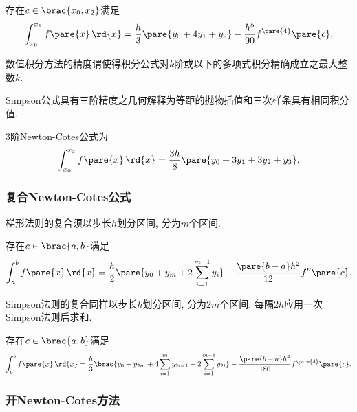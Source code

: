 \documentclass{ctexart}
\begin{document}
\begin{theorem}[Simpson法则]
    存在$c\in\brac{x_0,x_2}$满足
    \[ \int_{x_0}^{x_1} f\pare{x}\,\rd{x} = \frac{h}{3}\pare{y_0 + 4y_1 + y_2} - \frac{h^5}{90}f^{\pare{4}}\pare{c}. \]
\end{theorem}
\begin{definition}[精度]
    数值积分方法的精度谓使得积分公式对$k$阶或以下的多项式积分精确成立之最大整数$k$.
\end{definition}
\begin{remark}
    Simpson公式具有三阶精度之几何解释为等距的抛物插值和三次样条具有相同积分值.
\end{remark}
\begin{ex}[Simpson 3/8公式]
    3阶Newton-Cotes公式为
    \[ \int_{x_0}^{x_3}f\pare{x}\,\rd{x} = \frac{3h}{8}\pare{y_0 + 3y_1 + 3y_2 + y_3}. \]
\end{ex}


\subsubsection[复合公式]{复合Newton-Cotes公式} %
\label{ssub:复合newton_cotes公式}

梯形法则的复合须以步长$h$划分区间, 分为$m$个区间.
\begin{theorem}[复合梯形法则]
    存在$c\in\brac{a,b}$满足
    \[ \int_a^b f\pare{x}\,\rd{x} = \frac{h}{2}\pare{y_0 + y_m + 2\sum_{i=1}^{m-1}y_i} - \frac{\pare{b-a}h^2}{12}f''\pare{c}. \]
\end{theorem}

Simpson法则的复合同样以步长$h$划分区间, 分为$2m$个区间, 每隔$2h$应用一次Simpson法则后求和.
\begin{theorem}[复合Simpson法则]
    存在$c\in\brac{a,b}$满足
    \[ \int_a^b f\pare{x}\,\rd{x} = \frac{h}{3}\brac{y_0 + y_{2m} + 4\sum_{i=1}^m y_{2i-1} + 2\sum_{i=1}^{m-1} y_{2i}} - \frac{\pare{b-a}h^4}{180}f^{\pare{4}}\pare{c}. \]
\end{theorem}


\subsubsection[开区间上积分]{开Newton-Cotes方法} %
\label{ssub:开newton_cotes方法}
\end{document}
